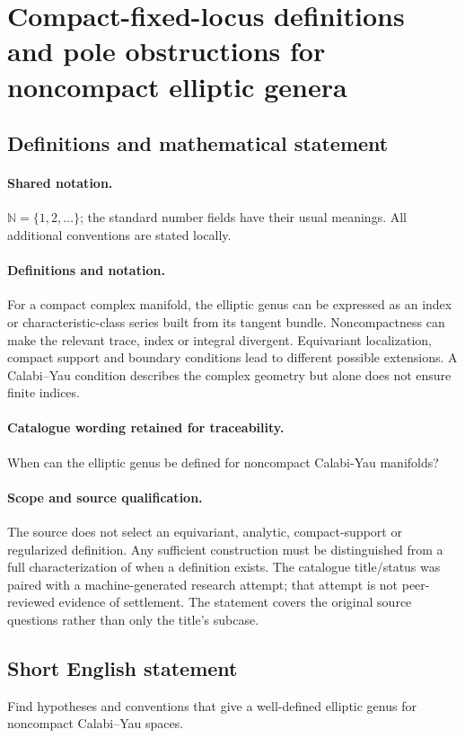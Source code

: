 \documentclass[11pt]{article}
\begin{document}
\section{Compact-fixed-locus definitions and pole obstructions for noncompact elliptic genera}\label{statement}

\subsection{Definitions and mathematical statement}

\paragraph{Shared notation.}$\mathbb N=\{1,2,\ldots\}$; the standard number fields have their usual meanings. All additional conventions are stated locally.


\paragraph{Definitions and notation.}For a compact complex manifold, the elliptic genus can be expressed as an index or characteristic-class series built from its tangent bundle. Noncompactness can make the relevant trace, index or integral divergent. Equivariant localization, compact support and boundary conditions lead to different possible extensions. A Calabi--Yau condition describes the complex geometry but alone does not ensure finite indices.

\paragraph{Catalogue wording retained for traceability.}
When can the elliptic genus be defined for noncompact Calabi-Yau manifolds?
\paragraph{Scope and source qualification.}The source does not select an equivariant, analytic, compact-support or regularized definition. Any sufficient construction must be distinguished from a full characterization of when a definition exists. The catalogue title/status was paired with a machine-generated research attempt; that attempt is not peer-reviewed evidence of settlement. The statement covers the original source questions rather than only the title’s subcase.
\subsection{Short English statement}
Find hypotheses and conventions that give a well-defined elliptic genus for noncompact Calabi–Yau spaces.
\end{document}
